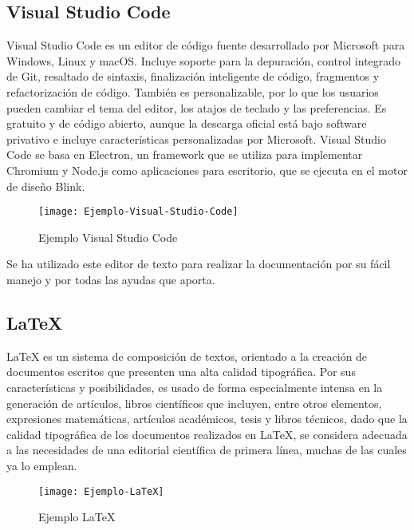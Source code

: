 \documentclass[ spanish, a4paper, 12pt, oneside]{report}
\begin{document}
\subsection{Visual Studio Code}
Visual Studio Code es un editor de código fuente desarrollado por Microsoft para Windows, Linux y macOS. Incluye soporte para la depuración, control integrado de Git, resaltado de sintaxis, finalización inteligente de código, fragmentos y refactorización de código. También es personalizable, 
por lo que los usuarios pueden cambiar el tema del editor, los atajos de teclado y las preferencias. Es gratuito y de código abierto, aunque la descarga oficial está bajo software privativo e incluye características personalizadas por Microsoft. Visual Studio Code se basa en 
Electron, un framework que se utiliza para implementar Chromium y Node.js como aplicaciones para escritorio, que se ejecuta en el motor de diseño Blink. \\

\begin{figure}[!h]
   \centering
   \texttt{[image: Ejemplo-Visual-Studio-Code]}\\
      \caption{\label{fig: Ejemplo Visual Studio Code} Ejemplo Visual Studio Code}
\end{figure}

Se ha utilizado este editor de texto para realizar la documentación por su fácil manejo y por todas las ayudas que aporta. \\

\subsection{LaTeX}
LaTeX es un sistema de composición de textos, orientado a la creación de documentos escritos que presenten una alta calidad tipográfica. Por sus características y posibilidades, 
es usado de forma especialmente intensa en la generación de artículos, libros científicos que incluyen, entre otros elementos, expresiones matemáticas, artículos académicos, tesis y 
libros técnicos, dado que la calidad tipográfica de los documentos realizados en LaTeX, se considera adecuada a las necesidades de una editorial científica de primera línea, muchas de 
las cuales ya lo emplean. \\

\begin{figure}[!h]
   \centering
   \texttt{[image: Ejemplo-LaTeX]}\\
      \caption{\label{fig: Ejemplo LaTeX} Ejemplo LaTeX}
\end{figure}
\end{document}
